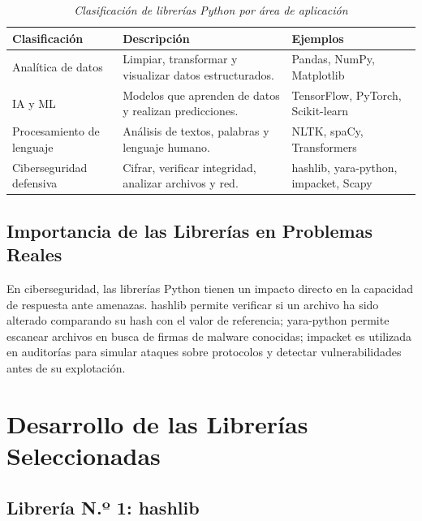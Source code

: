 \documentclass[12pt,a4paper]{article}
\begin{document}
\begin{table}[H]
\centering
\begin{threeparttable}
\caption{\textit{Clasificación de librerías Python por área de aplicación}}
\begin{tabular}{p{3cm}p{5cm}p{5cm}}
\toprule
\textbf{Clasificación} & \textbf{Descripción} & \textbf{Ejemplos} \\
\midrule
Analítica de datos & Limpiar, transformar y visualizar datos estructurados. & Pandas, NumPy, Matplotlib \\
IA y ML & Modelos que aprenden de datos y realizan predicciones. & TensorFlow, PyTorch, Scikit-learn \\
Procesamiento de lenguaje & Análisis de textos, palabras y lenguaje humano. & NLTK, spaCy, Transformers \\
Ciberseguridad defensiva & Cifrar, verificar integridad, analizar archivos y red. & hashlib, yara-python, impacket, Scapy \\
\bottomrule
\end{tabular}
\end{threeparttable}
\end{table}

\subsection{Importancia de las Librerías en Problemas Reales}

En ciberseguridad, las librerías Python tienen un impacto directo en la
capacidad de respuesta ante amenazas. hashlib permite verificar si un
archivo ha sido alterado comparando su hash con el valor de referencia;
yara-python permite escanear archivos en busca de firmas de malware
conocidas; impacket es utilizada en auditorías para simular ataques
sobre protocolos y detectar vulnerabilidades antes de su explotación.

\section{Desarrollo de las Librerías Seleccionadas}

\subsection{Librería N.º 1: hashlib}
\end{document}
